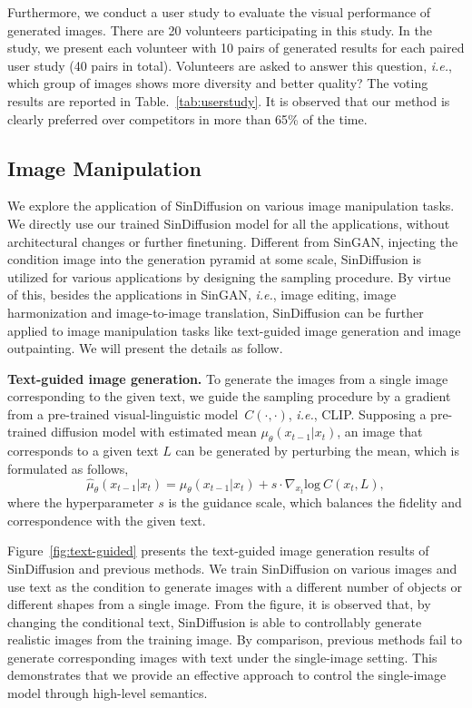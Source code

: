 \documentclass[10pt,twocolumn,letterpaper]{article}
\begin{document}
Furthermore, we conduct a user study to evaluate the visual performance of generated images.
There are 20 volunteers participating in this study.
In the study, we present each volunteer with 10 pairs of generated results for each paired user study (40 pairs in total).
Volunteers are asked to answer this question, \emph{i.e.}, which group of images shows more diversity and better quality?
The voting results are reported in Table.~\ref{tab:userstudy}.
It is observed that our method is clearly preferred over competitors in more than 65\% of the time.

\subsection{Image Manipulation}
We explore the application of SinDiffusion on various image manipulation tasks.
We directly use our trained SinDiffusion model for all the applications, without architectural changes or further finetuning.
Different from SinGAN, injecting the condition image into the generation pyramid at some scale, SinDiffusion is utilized for various applications by designing the sampling procedure.
By virtue of this, besides the applications in SinGAN, \emph{i.e.}, image editing, image harmonization and image-to-image translation, SinDiffusion can be further applied to image manipulation tasks like text-guided image generation and image outpainting.
We will present the details as follow.

\noindent \textbf{Text-guided image generation.}
To generate the images from a single image corresponding to the given text, we guide the sampling procedure by a gradient from a pre-trained visual-linguistic model~$C(\cdot, \cdot)$, \emph{i.e.}, CLIP. 
Supposing a pre-trained diffusion model with estimated mean $\mu_\theta(x_{t-1} | x_t)$, an image that corresponds to a given text $L$ can be generated by perturbing the mean, which is formulated as follows,
\begin{equation}
    \hat{\mu}_\theta(x_{t-1}|x_t) = \mu_\theta(x_{t-1}|x_t) + s \cdot \nabla_{x_t} \text{log}~C(x_t, L),
\end{equation}
where the hyperparameter $s$ is the guidance scale, which balances the fidelity and correspondence with the given text. 

Figure~\ref{fig:text-guided} presents the text-guided image generation results of SinDiffusion and previous methods.
We train SinDiffusion on various images and use text as the condition to generate images with a different number of objects or different shapes from a single image.
From the figure, it is observed that, by changing the conditional text, SinDiffusion is able to controllably generate realistic images from the training image. 
By comparison, previous methods fail to generate corresponding images with text under the single-image setting.
This demonstrates that we provide an effective approach to control the single-image model through high-level semantics.
\end{document}
